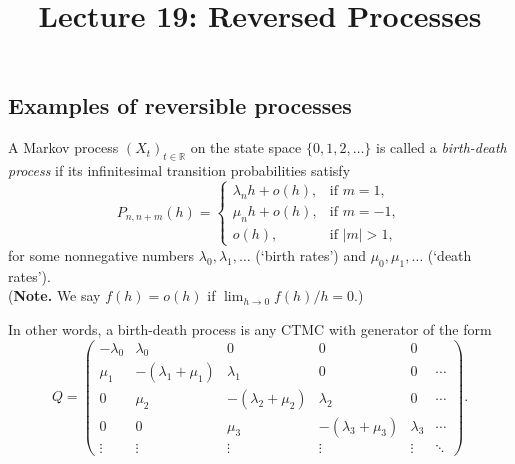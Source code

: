 \documentclass[a4paper,10pt,english]{article}
\title{Lecture 19: Reversed Processes}
\author{}
\begin{document}
\maketitle

\subsection{Examples of reversible processes}
\begin{shaded*}
\begin{exmp}
\label{exmp:birthdeath}
\begin{defn}
A Markov process $(X_t)_{t \in \mathbb{R}}$ on the state space $\{0, 1, 2, \ldots\}$ is called a {\em birth-death process} if its infinitesimal transition probabilities satisfy
\[ P_{n,n+m}(h) = \left\{
   \begin{array}{ll} %
      \lambda_n h + o(h), & \text{if } m = 1, \\
      \mu_n h + o(h), & \text{if } m = -1, \\
      o(h), & \text{if } |m| > 1, 
   \end{array}\right.
\]
for some nonnegative numbers $\lambda_0, \lambda_1, \ldots$ (`birth rates') and $\mu_0, \mu_1, \ldots$ (`death rates'). \\
({\bf Note.} We say $f(h) = o(h)$ if $\lim_{h \to 0} f(h)/h = 0$.)
\end{defn}
In other words, a birth-death process is any CTMC with generator of the form 
\[ 
   Q = \left( \begin{array}{cccccc} %
      -\lambda_0 & \lambda_0 & 0 & 0 & 0\\
      \mu_1 & -(\lambda_1 + \mu_1) & \lambda_1 & 0 & 0 & \cdots\\
      0 & \mu_2 & -(\lambda_2 + \mu_2) & \lambda_2 & 0 & \cdots\\
      0 & 0 & \mu_3 & -(\lambda_3 + \mu_3) & \lambda_3 & \cdots \\
      \vdots & \vdots & \vdots & \vdots & \vdots  & \ddots
   \end{array} \right).
\]
\end{exmp}
\end{shaded*}
\end{document}
